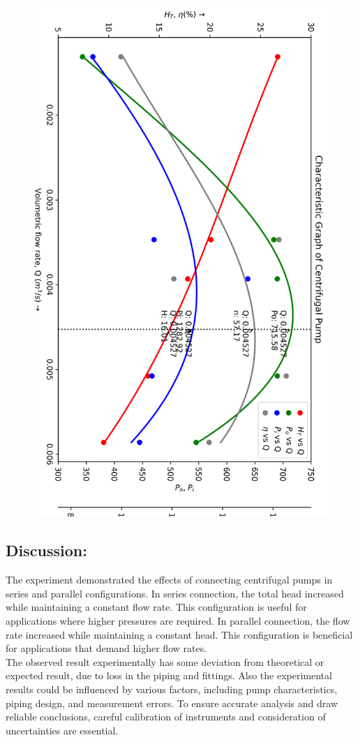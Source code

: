 \documentclass[12pt]{article}
\begin{document}
  \begin{figure}[h]
  \begin{center}
    
    \includegraphics[width=0.85\linewidth]{img/characteriestics_graph.png}
  \end{center}
  \end{figure}

\pagebreak
\subsection*{Discussion:}
The experiment demonstrated the effects of connecting centrifugal pumps in series and parallel configurations. In series connection, the total head increased while maintaining a constant flow rate. This configuration is useful for applications where higher pressures are required. In parallel connection, the flow rate increased while maintaining a constant head. This configuration is beneficial for applications that demand higher flow rates. \\ 

The observed result experimentally has some deviation from theoretical or expected result, due to loss in the piping and fittings. Also the experimental results could be influenced by various factors, including pump characteristics, piping design, and measurement errors. To ensure accurate analysis and draw reliable conclusions, careful calibration of instruments and consideration of uncertainties are essential. 

\pagebreak
 
\end{document}
